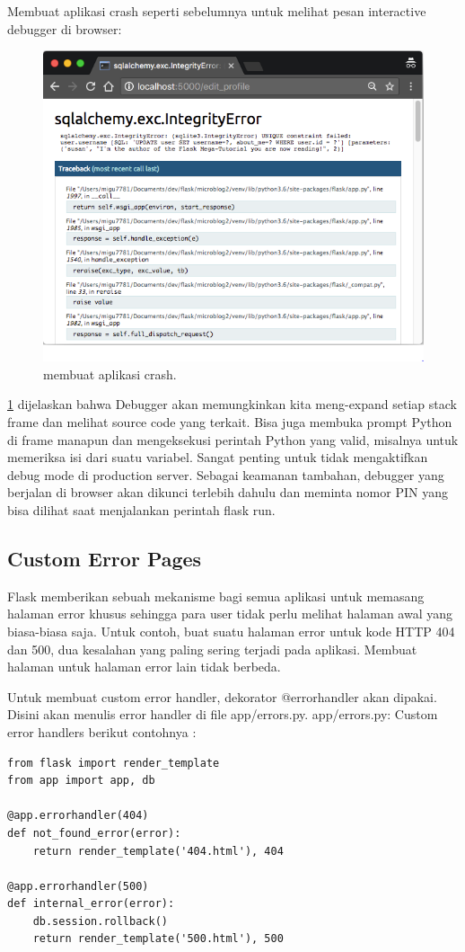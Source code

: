  Membuat aplikasi crash seperti sebelumnya untuk melihat pesan interactive debugger di browser:
 
 \begin{figure}[ht]
\centerline{\includegraphics[width=1\textwidth]{figures/5eror.PNG}}
\caption{membuat aplikasi crash.}
\label{eror}
\end{figure}
\ref{eror} dijelaskan bahwa Debugger akan memungkinkan kita meng-expand setiap stack frame dan melihat source code yang terkait. Bisa juga membuka prompt Python di frame manapun dan mengeksekusi perintah Python yang valid, misalnya untuk memeriksa isi dari suatu variabel. Sangat penting untuk tidak mengaktifkan debug mode di production server. Sebagai keamanan tambahan, debugger yang berjalan di browser akan dikunci terlebih dahulu dan meminta nomor PIN yang bisa dilihat saat menjalankan perintah flask run. 


\subsection{Custom Error Pages}
Flask memberikan sebuah mekanisme bagi semua aplikasi untuk memasang halaman error khusus sehingga para user tidak perlu melihat halaman awal yang biasa-biasa saja. Untuk contoh, buat suatu halaman error untuk kode HTTP 404 dan 500, dua kesalahan yang paling sering terjadi pada aplikasi. Membuat halaman untuk halaman error lain tidak berbeda.

Untuk membuat custom error handler, dekorator @errorhandler akan dipakai. Disini akan menulis error handler di file app/errors.py.
app/errors.py: Custom error handlers berikut contohnya :
\begin{verbatim}
from flask import render_template
from app import app, db

@app.errorhandler(404)
def not_found_error(error):
    return render_template('404.html'), 404

@app.errorhandler(500)
def internal_error(error):
    db.session.rollback()
    return render_template('500.html'), 500
 \end{verbatim}
 
